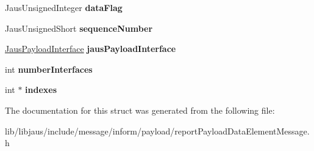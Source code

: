 \begin{DoxyCompactItemize}
\item 
\hypertarget{struct_report_payload_data_element_message_struct_a84fb56ecfcfd60c78caf369b334be47c}{\-Jaus\-Unsigned\-Integer {\bfseries data\-Flag}}\label{struct_report_payload_data_element_message_struct_a84fb56ecfcfd60c78caf369b334be47c}

\item 
\hypertarget{struct_report_payload_data_element_message_struct_a32f642ef85a612d611a9a265f7ab3a7d}{\-Jaus\-Unsigned\-Short {\bfseries sequence\-Number}}\label{struct_report_payload_data_element_message_struct_a32f642ef85a612d611a9a265f7ab3a7d}

\item 
\hypertarget{struct_report_payload_data_element_message_struct_a5362522480da6ae45cfb15a9e70161f6}{\hyperlink{struct_jaus_payload_interface_struct}{\-Jaus\-Payload\-Interface} {\bfseries jaus\-Payload\-Interface}}\label{struct_report_payload_data_element_message_struct_a5362522480da6ae45cfb15a9e70161f6}

\item 
\hypertarget{struct_report_payload_data_element_message_struct_ad1669f70fa0164485da618316d6cbcf9}{int {\bfseries number\-Interfaces}}\label{struct_report_payload_data_element_message_struct_ad1669f70fa0164485da618316d6cbcf9}

\item 
\hypertarget{struct_report_payload_data_element_message_struct_a1f782a8b5efdd121313008d6cd4cc1af}{int $\ast$ {\bfseries indexes}}\label{struct_report_payload_data_element_message_struct_a1f782a8b5efdd121313008d6cd4cc1af}

\end{DoxyCompactItemize}


\-The documentation for this struct was generated from the following file\-:\begin{DoxyCompactItemize}
\item 
lib/libjaus/include/message/inform/payload/report\-Payload\-Data\-Element\-Message.\-h\end{DoxyCompactItemize}
